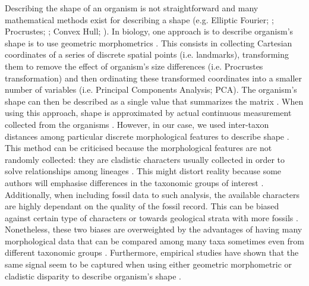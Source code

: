 Describing the shape of an organism is not straightforward and many mathematical methods exist for describing a shape (e.g. Elliptic Fourier; \citealt{Fourier1982}; Procrustes; \citealt{JamesRohlf1993129}; Convex Hull; \citealt{ANDREW1979216}).
In biology, one approach is to describe organism's shape is to use geometric morphometrics \citep{zelditch2012geometric}.
This consists in collecting Cartesian coordinates of a series of discrete spatial points (i.e. landmarks), transforming them to remove the effect of organism's size differences (i.e. Procrustes transformation) and then ordinating these transformed coordinates into a smaller number of variables (i.e. Principal Components Analysis; PCA).
The organism's shape can then be described as a single value that summarizes the matrix \citep[e.g. the sum of the ranges of each PCA axis][]{zelditch2012geometric}.
When using this approach, shape is approximated by actual continuous measurement collected from the organisms \citep[e.g.][]{friedmanexplosive2010,hopkinsdecoupling2013,finlay2015morphological}.
However, in our case, we used inter-taxon distances among particular discrete morphological features to describe shape \citep[i.e. the cladistic disparity method; e.g.][]{foote1997evolution,Wills2001,Wesley-Hunt2005}.
This method can be criticised because the morphological features are not randomly collected: they are cladistic characters usually collected in order to solve relationships among lineages \citep{O'Leary08022013}.
This might distort reality because some authors will emphasise differences in the taxonomic groups of interest \citep{Hopkins24032015}.
Additionally, when including fossil data to such analysis, the available characters are highly dependant on the quality of the fossil record.
This can be biased against certain type of characters \citep[e.g. soft tissue ones;][]{sansomfossilization2013} or towards geological strata with more fossils \citep[e.g. \textit{Lagerst\"{a}tten};][]{Butler2012}.
Nonetheless, these two biases are overweighted by the advantages of having many morphological data \citep[some morphological matrices have more than 1000 morphological characters; e.g.][]{O'Leary08022013,ni2013oldest} that can be compared among many taxa sometimes even from different taxonomic groups \citep[e.g. among all mammals;][]{O'Leary08022013,slaterphylogenetic2013,beckancient2014}.
Furthermore, empirical studies have shown that the same signal seem to be captured when using either geometric morphometric or cladistic disparity to describe organism's shape \citep{foth2012different,hetherington2015cladistic}. 

